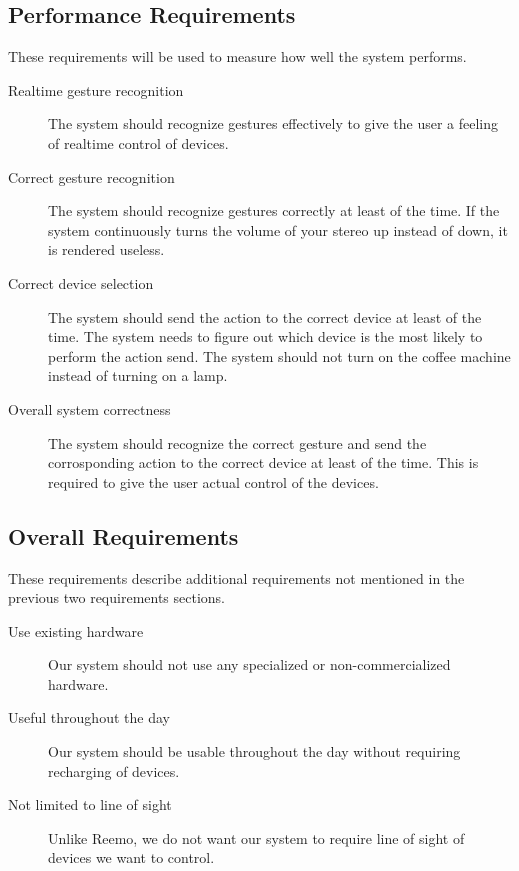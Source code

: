 \subsection{Performance Requirements}
These requirements will be used to measure how well the system performs. 
\begin{description}
    \item[Realtime gesture recognition] The system should recognize gestures effectively to give the user a feeling of realtime control of devices.
    \item[Correct gesture recognition] The system should recognize gestures correctly at least  of the time. If the system continuously turns the volume of your stereo up instead of down, it is rendered useless.  
    \item[Correct device selection] The system should send the action to the correct device at least  of the time. The system needs to figure out which device is the most likely to perform the action send. The system should not turn on the coffee machine instead of turning on a lamp. 
    \item[Overall system correctness] The system should recognize the correct gesture and send the corrosponding action to the correct device at least  of the time. This is required to give the user actual control of the devices. 
\end{description}
    
\subsection{Overall Requirements}
These requirements describe additional requirements not mentioned in the previous two requirements sections.
\begin{description}
    \item[Use existing hardware] Our system should not use any specialized or non-commercialized hardware.  
    \item[Useful throughout the day] Our system should be usable throughout the day without requiring recharging of devices. 
    \item[Not limited to line of sight] Unlike Reemo, we do not want our system to require line of sight of devices we want to control. 
\end{description}
